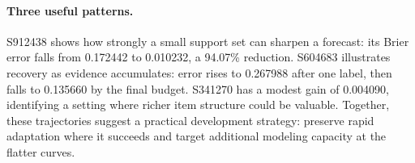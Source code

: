 \paragraph{Three useful patterns.}
S912438 shows how strongly a small support set can sharpen a forecast: its Brier error falls from 0.172442 to 0.010232, a 94.07\% reduction. S604683 illustrates recovery as evidence accumulates: error rises to 0.267988 after one label, then falls to 0.135660 by the final budget. S341270 has a modest gain of 0.004090, identifying a setting where richer item structure could be valuable. Together, these trajectories suggest a practical development strategy: preserve rapid adaptation where it succeeds and target additional modeling capacity at the flatter curves.
